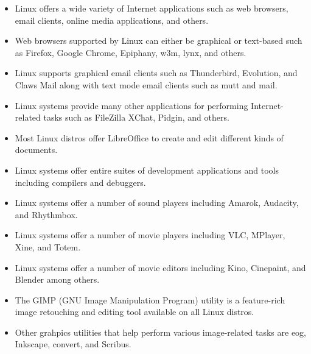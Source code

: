 \begin{itemize}
\itemsep1pt\parskip0pt
\item
  Linux offers a wide variety of Internet applications such as web
  browsers, email clients, online media applications, and others.
\item
  Web browsers supported by Linux can either be graphical or text-based
  such as Firefox, Google Chrome, Epiphany, w3m, lynx, and others.
\item
  Linux supports graphical email clients such as Thunderbird, Evolution,
  and Claws Mail along with text mode email clients such as mutt and
  mail.
\item
  Linux systems provide many other applications for performing
  Internet-related tasks such as FileZilla XChat, Pidgin, and others.
\item
  Most Linux distros offer LibreOffice to create and edit different
  kinds of documents.
\item
  Linux systems offer entire suites of development applications and
  tools including compilers and debuggers.
\item
  Linux systems offer a number of sound players including Amarok,
  Audacity, and Rhythmbox.
\item
  Linux systems offer a number of movie players including VLC, MPlayer,
  Xine, and Totem.
\item
  Linux systems offer a number of movie editors including Kino,
  Cinepaint, and Blender among others.
\item
  The GIMP (GNU Image Manipulation Program) utility is a feature-rich
  image retouching and editing tool available on all Linux distros.
\item
  Other grahpics utilities that help perform various image-related tasks
  are eog, Inkscape, convert, and Scribus.
\end{itemize}
